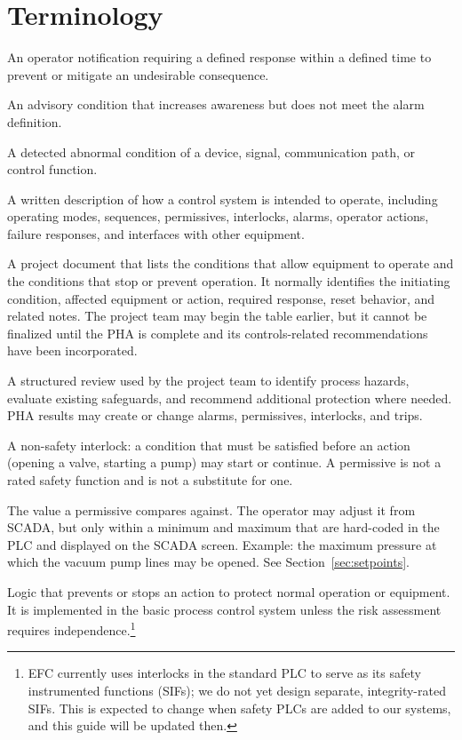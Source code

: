 \chapter{Terminology}\label{ch:terminology}
\begin{description}[style=nextline,leftmargin=0pt]
  \item[Alarm] An operator notification requiring a defined response within a defined time to prevent or mitigate an undesirable consequence.
  \item[Warning] An advisory condition that increases awareness but does not meet the alarm definition.
  \item[Fault] A detected abnormal condition of a device, signal, communication path, or control function.
  \item[Control narrative] A written description of how a control system is intended to operate, including operating modes, sequences, permissives, interlocks, alarms, operator actions, failure responses, and interfaces with other equipment.
  \item[Table of Interlocks and Permissives] A project document that lists the conditions that allow equipment to operate and the conditions that stop or prevent operation. It normally identifies the initiating condition, affected equipment or action, required response, reset behavior, and related notes. The project team may begin the table earlier, but it cannot be finalized until the PHA is complete and its controls-related recommendations have been incorporated.
  \item[Process Hazard Analysis (PHA)] A structured review used by the project team to identify process hazards, evaluate existing safeguards, and recommend additional protection where needed. PHA results may create or change alarms, permissives, interlocks, and trips.
  \item[Permissive] A non-safety interlock: a condition that must be satisfied before an action (opening a valve, starting a pump) may start or continue. A permissive is not a rated safety function and is not a substitute for one.
  \item[Permissive setpoint] The value a permissive compares against. The operator may adjust it from SCADA, but only within a minimum and maximum that are hard-coded in the PLC and displayed on the SCADA screen. Example: the maximum pressure at which the vacuum pump lines may be opened. See Section~\ref{sec:setpoints}.
  \item[Control interlock] Logic that prevents or stops an action to protect normal operation or equipment. It is implemented in the basic process control system unless the risk assessment requires independence.\footnote{EFC currently uses interlocks in the standard PLC to serve as its safety instrumented functions (SIFs); we do not yet design separate, integrity-rated SIFs. This is expected to change when safety PLCs are added to our systems, and this guide will be updated then.}

\end{description}
